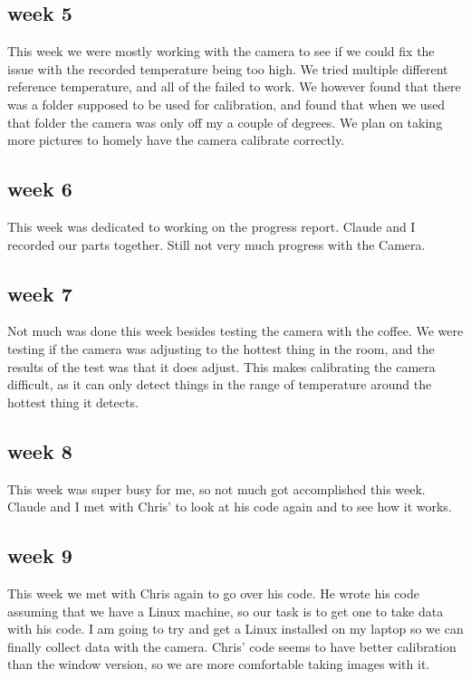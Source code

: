 \documentclass[onecolumn, draftclsnofoot,10pt, compsoc]{IEEEtran}
\begin{document}
\subsection{week 5}
This week we were mostly working with the camera to see if we could fix the issue with the recorded temperature being too high. We tried multiple different reference temperature, and all of the failed to work. We however found that there was a folder supposed to be used for calibration, and found that when we used that folder the camera was only off my a couple of degrees. We plan on taking more pictures to homely have the camera calibrate correctly.
\subsection{week 6}
This week was dedicated to working on the progress report. Claude and I recorded our parts together. Still not very much progress with the Camera.
\subsection{week 7}
Not much was done this week besides testing the camera with the coffee. We were testing if the camera was adjusting to the hottest thing in the room, and the results of the test was that it does adjust. This makes calibrating the camera difficult, as it can only detect things in the range of temperature around the hottest thing it detects.
\subsection{week 8}
This week was super busy for me, so not much got accomplished this week. Claude and I met with Chris' to look at his code again and to see how it works.

\subsection{week 9}
This week we met with Chris again to go over his code. He wrote his code assuming that we have a Linux machine, so our task is to get one to take data with his code. I am going to try and get a Linux installed on my laptop so we can finally collect data with the camera. Chris' code seems to have better calibration than the window version, so we are more comfortable taking images with it.
\end{document}
